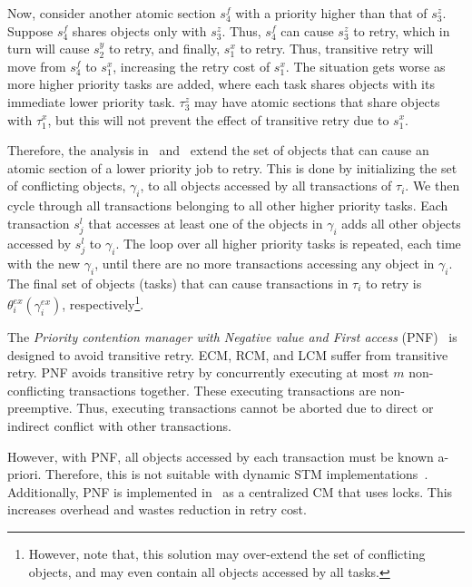 \documentclass[prodmode,acmtecs]{acmsmall}
\begin{document}
Now, consider another atomic section $s_4^f$ with a priority higher than that of $s_3^z$. Suppose $s_4^f$ shares objects only with $s_3^z$. Thus, $s_4^f$ can cause $s_3^z$ to retry, which in turn will cause $s_2^y$ to retry, and finally, $s_1^x$ to retry. Thus, transitive retry will move from $s_{4}^{f}$ to $s_{1}^{x}$, increasing the retry cost of $s_{1}^{x}$. The situation gets worse as more higher priority tasks are added, where each task shares objects with its immediate lower priority task. $\tau_{3}^{z}$ may have atomic sections that share objects with $\tau_{1}^{x}$,
but this will not prevent the effect of transitive retry due to $s_{1}^{x}$.



Therefore, the analysis in~\cite{stmconcurrencycontrol:emsoft11} and~\cite{lcmdac2012} extend the set of objects that can cause an atomic section of a lower priority job to retry.  This is done by initializing the set of conflicting objects, $\gamma_i$, to all objects accessed by all transactions of $\tau_i$. We then cycle through all transactions belonging to all other higher priority tasks. Each transaction $s_j^l$ that accesses at least one of the objects in $\gamma_i$ adds all other objects accessed by $s_j^l$ to $\gamma_i$. The loop over all higher priority tasks is repeated, each time with the new $\gamma_i$, until there are no more transactions accessing any object in $\gamma_i$. The final set of objects (tasks) that can cause transactions in $\tau_i$ to retry is $\theta_i^{ex}(\gamma_i^{ex})$, respectively\footnote{However, note that, this solution may over-extend the set of conflicting objects, and may even contain all objects accessed by all tasks.}. 

The \textit{Priority contention manager with Negative value and First access} (PNF)~\cite{shambake_phd_proposal} 
%
is designed to avoid transitive retry. ECM, RCM, and LCM suffer from transitive retry. PNF avoids transitive retry by concurrently executing at most $m$ non-conflicting transactions together. These executing transactions are non-preemptive. Thus, executing transactions cannot be aborted due to direct or indirect conflict with other transactions.

However, with PNF, all objects accessed by each transaction must be known a-priori. Therefore, this is not suitable with dynamic STM implementations~\cite{Herlihy:2003:STM:872035.872048}. Additionally, PNF is implemented in~\cite{shambake_phd_proposal} as a centralized CM that uses locks. This increases overhead and wastes reduction in retry cost. 
\end{document}
